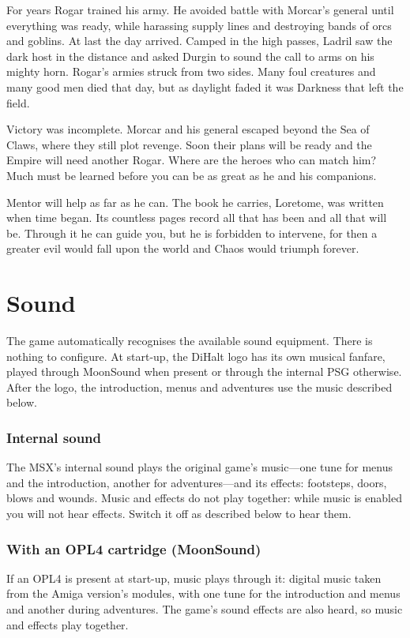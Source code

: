 For years Rogar trained his army. He avoided battle with Morcar's general until everything was ready, while harassing supply lines and destroying bands of orcs and goblins. At last the day arrived. Camped in the high passes, Ladril saw the dark host in the distance and asked Durgin to sound the call to arms on his mighty horn. Rogar's armies struck from two sides. Many foul creatures and many good men died that day, but as daylight faded it was Darkness that left the field.

Victory was incomplete. Morcar and his general escaped beyond the Sea of Claws, where they still plot revenge. Soon their plans will be ready and the Empire will need another Rogar. Where are the heroes who can match him? Much must be learned before you can be as great as he and his companions.

Mentor will help as far as he can. The book he carries, Loretome, was written when time began. Its countless pages record all that has been and all that will be. Through it he can guide you, but he is forbidden to intervene, for then a greater evil would fall upon the world and Chaos would triumph forever.

\chapter{Sound}
The game automatically recognises the available sound equipment. There is nothing to configure. At start-up, the DiHalt logo has its own musical fanfare, played through MoonSound when present or through the internal PSG otherwise. After the logo, the introduction, menus and adventures use the music described below.
\subsection{Internal sound}
The MSX's internal sound plays the original game's music---one tune for menus and the introduction, another for adventures---and its effects: footsteps, doors, blows and wounds. Music and effects do not play together: while music is enabled you will not hear effects. Switch it off as described below to hear them.
\subsection{With an OPL4 cartridge (MoonSound)}
If an OPL4 is present at start-up, music plays through it: digital music taken from the Amiga version's modules, with one tune for the introduction and menus and another during adventures. The game's sound effects are also heard, so music and effects play together.
